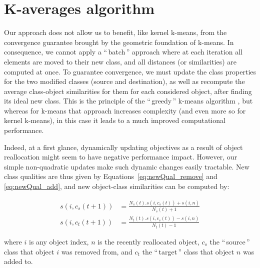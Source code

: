 \documentclass[natbib,smallextended]{svjour3}
\newcommand{\gl}[1]{``\,#1\,''} %
\begin{document}
\section{K-averages algorithm}
\label{sec:algo}

Our approach does not allow us to benefit, like kernel k-means, from the convergence guarantee brought by the geometric foundation of k-means. In consequence, we cannot apply a \gl{batch} approach where at each iteration all elements are moved to their new class, and all distances (or similarities) are computed at once. To guarantee convergence, we must update the class properties for the two modified classes (source and destination), as well as recompute the average class-object similarities for them for each considered object, after finding its ideal new class. This is the principle of the \gl{greedy} k-means algorithm \citep[Chapter10.8]{Duda01}, but whereas for k-means that approach increases complexity (and even more so for kernel k-means), in this case it leads to a much improved computational performance.

Indeed, at a first glance, dynamically updating objectives as a result of object reallocation might seem to have negative performance impact. However, our simple non-quadratic updates make such dynamic changes easily tractable. New class qualities are thus given by Equations~\ref{eq:newQual_remove} and \ref{eq:newQual_add}, and new object-class similarities can be computed by:


\begin{equation}
	\begin{aligned}
    s(i, c_s(t+1)) &= \frac{N_s(t).s(i, c_s(t)) + s(i,n)}{N_s(t)+1} \\
    s(i, c_t(t+1)) &= \frac{N_t(t).s(i, c_s(t)) - s(i,n)}{N_t(t)-1}
   	\end{aligned}
  \label{eq:newSimilNewC}
\end{equation}

\noindent where $i$ is any object index, $n$ is the recently reallocated object, $c_s$ the \gl{source} class that object $i$ was removed from, and $c_t$ the \gl{target} class that object $n$ was added to.
\end{document}
